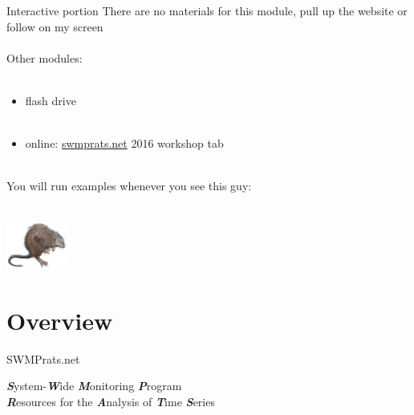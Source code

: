 \documentclass[xcolor=dvipsnames,serif]{beamer}\usepackage[]{graphicx}\usepackage[]{color}
\newcommand{\Bigtxt}[1]{\textbf{\textit{#1}}}
\begin{document}
\begin{frame}{Interactive portion}
\onslide<+->
There are no materials for this module, pull up the website or follow on my screen\\~\\
Other modules: \\~\\
\begin{itemize}
\item flash drive\\~\\
\item online: \href{http://swmprats.net/}{swmprats.net} 2016 workshop tab \\~\\
\end{itemize}
\onslide<+->
You will run examples whenever you see this guy: \\~\\
\centerline{\includegraphics[width = 0.15\textwidth]{imgs/swmprat.png}} 
\end{frame}

\section{Overview}

\begin{frame}{SWMPrats.net}
\centerline{}
\vspace{0.2in}
\Large
\Bigtxt{S}ystem-\Bigtxt{W}ide \Bigtxt{M}onitoring \Bigtxt{P}rogram \\
\hspace{0.5in} \Bigtxt{R}esources for the \Bigtxt{A}nalysis of \Bigtxt{T}ime \Bigtxt{S}eries \\~\\
\normalsize
\end{frame}
\end{document}

